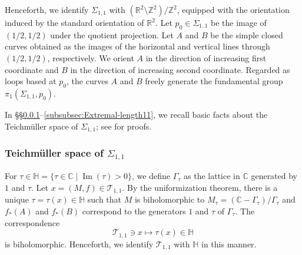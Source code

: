 \documentclass[dvipdfmx]{amsart}
\theoremstyle{remark}
\newcommand{\teich}{\mathcal{T}}
\begin{document}
Henceforth, we identify $\Sigma_{1,1}$ with
$(\mathbb{R}^2\setminus\mathbb{Z}^2)/\mathbb{Z}^2$, equipped with the orientation induced by the standard orientation of $\mathbb{R}^2$. Let $p_0\in\Sigma_{1,1}$ be the image of $(1/2,1/2)$ under the quotient projection. Let $A$ and $B$ be the simple closed curves obtained as the images of the horizontal and vertical lines through $(1/2,1/2)$, respectively. We orient $A$ in the direction of increasing first coordinate and $B$ in the direction of increasing second coordinate. Regarded as loops based at $p_0$, the curves $A$ and $B$ freely generate the fundamental group $\pi_1(\Sigma_{1,1},p_0)$.

In \S\S\ref{subsubsec:TeichmullerSpace11}--\ref{subsubsec:Extremal-length11}, we recall basic facts about the Teichm\"uller space of $\Sigma_{1,1}$; see \cite{miyachi2025functiontheorydynamicsergodic} for proofs.

\subsubsection{Teichm\"uller space of $\Sigma_{1,1}$}
\label{subsubsec:TeichmullerSpace11}
For $\tau\in \mathbb{H}=\{\tau\in \mathbb{C}\mid \operatorname{Im}(\tau)>0\}$, we define $\Gamma_\tau$ as the lattice in $\mathbb{C}$ generated by $1$ and $\tau$.
Let $x=(M,f)\in \teich_{1,1}$.
By the uniformization theorem, there is a unique $\tau=\tau(x)\in \mathbb H$ such that $M$ is biholomorphic to $M_\tau=(\mathbb{C}-\Gamma_\tau)/\Gamma_\tau$ and $f_*(A)$ and $f_*(B)$ correspond to the generators $1$ and $\tau$ of $\Gamma_\tau$.
The correspondence
\[
\teich_{1,1}\ni x\mapsto \tau(x)\in \mathbb{H}
\]
is biholomorphic. Henceforth, we identify $\teich_{1,1}$ with $\mathbb{H}$ in this manner.
\end{document}
